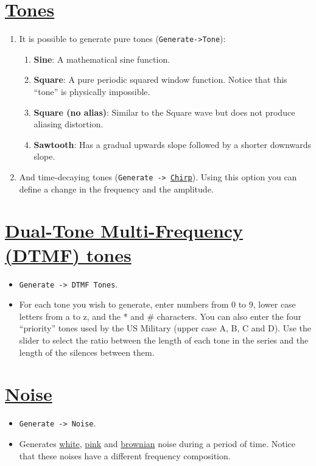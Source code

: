 \section{\href{http://manual.audacityteam.org/o/man/generate_menu.html\#tone}{Tones}}
\begin{enumerate}
\item It is possible to generate pure tones (\verb|Generate->Tone|):
  \begin{enumerate}
  \item \textbf{Sine}: A mathematical sine function.
  \item \textbf{Square}: A pure periodic squared window
    function. Notice that this ``tone'' is physically impossible.
  \item \textbf{Square (no alias)}: Similar to the Square wave but
    does not produce aliasing distortion.
  \item \textbf{Sawtooth}: Has a gradual upwards slope followed by a shorter downwards slope. 
  \end{enumerate}
\item And time-decaying tones
  (\verb|Generate -> |\href{http://manual.audacityteam.org/o/man/generate_menu.html#chirp}{\texttt{Chirp}}). Using
  this option you can define a change in the frequency and the
  amplitude.
\end{enumerate}

\section{\href{http://manual.audacityteam.org/o/man/generate_menu.html\#dtmf}{Dual-Tone Multi-Frequency (DTMF) tones}}
\begin{itemize}
\item \verb|Generate -> DTMF Tones|.
\item For each tone you wish to generate, enter numbers from 0 to 9,
  lower case letters from a to z, and the * and \# characters. You can
  also enter the four ``priority'' tones used by the US Military
  (upper case A, B, C and D). Use the slider to select the ratio
  between the length of each tone in the series and the length of the
  silences between them.
\end{itemize}

\section{\href{http://manual.audacityteam.org/o/man/generate_menu.html\#noise}{Noise}}
\begin{itemize}
\item \verb|Generate -> Noise|.
\item Generates
  \href{http://en.wikipedia.org/wiki/White_noise}{white},
  \href{http://en.wikipedia.org/wiki/Pink_noise}{pink} and
  \href{http://en.wikipedia.org/wiki/Brownian_noise}{brownian} noise
  during a period of time. Notice that these noises have a different
  frequency composition.
\end{itemize}

